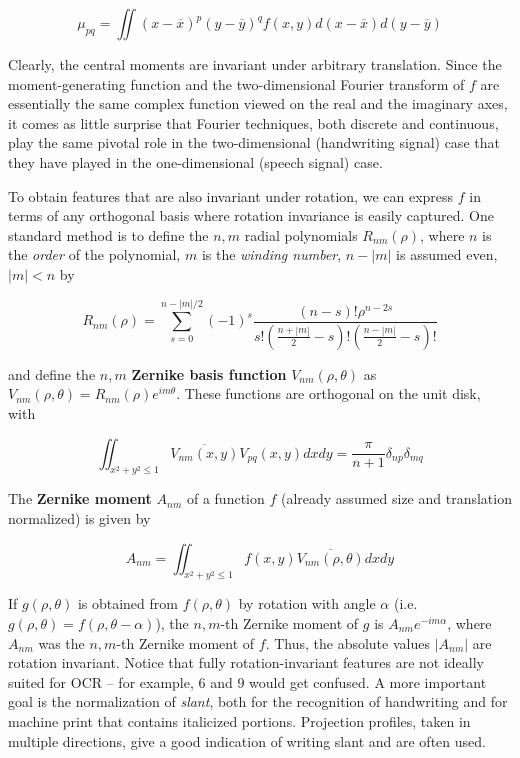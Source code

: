 \begin{equation}
\mu_{pq} = \iint (x-\overline{x})^p (y-\overline{y})^q f(x,y)
d(x-\overline{x}) d(y-\overline{y})
\end{equation}

\noindent
Clearly, the central moments are invariant under arbitrary translation. Since
the moment-generating function and the two-dimensional Fourier transform of $f$
are essentially the same complex function viewed on the real and the imaginary
axes, it comes as little surprise that Fourier techniques, both discrete and
continuous, play the same pivotal role in the two-dimensional (handwriting
signal) case that they have played in the one-dimensional (speech signal) case.

To obtain features that are also invariant under rotation, we can express $f$
in terms of any orthogonal basis where rotation invariance is easily captured.
One standard method is to define the $n,m$ radial polynomials $R_{nm}(\rho)$,
where $n$ is the {\it order} of the polynomial, $m$ is the {\it winding
  number}, $n-|m|$ is assumed even, $|m|<n$ by 

\begin{equation}
R_{nm}(\rho)=\sum_{s=0}^{n-|m|/2} (-1)^s \frac{(n-s)! \rho^{n-2s}}{s! \left( \frac{n+|m|}{2}-s \right) ! \left( \frac{n-|m|}{2}-s \right) !}
\end{equation}

\noindent and define the $n,m$ {\bf Zernike basis function}
$V_{nm}(\rho,\theta)$ as $V_{nm}(\rho,\theta)=R_{nm}(\rho)e^{im\theta}$. These
functions are orthogonal on the unit disk, with

\begin{equation}
\iint_{x^2+y^2 \leq 1} \overline{V_{nm}(x,y)}V_{pq}(x,y)dx dy =
\frac{\pi}{n+1} \delta_{np}\delta_{mq}
\end{equation}

\noindent
The {\bf Zernike moment} $A_{nm}$ of a function
$f$ (already assumed size and translation normalized) is given by 

\begin{equation}
A_{nm}=\iint_{x^2+y^2 \leq 1}f(x,y)\overline{V_{nm}(\rho,\theta)}dx dy
\end{equation}

\noindent
If $g(\rho,\theta)$ is obtained from $f(\rho,\theta)$ by rotation with angle
$\alpha$ (i.e. $g(\rho,\theta)=f(\rho,\theta-\alpha)$), the $n,m$-th Zernike
moment of $g$ is $A_{nm}e^{-i m\alpha}$, where $A_{nm}$ was the $n,m$-th
Zernike moment of $f$. Thus, the absolute values $|A_{nm}|$ are rotation
invariant. Notice that fully rotation-invariant features are not ideally
suited for OCR -- for example, $6$ and $9$ would get confused. A more
important goal is the normalization of {\it slant}, both for the recognition
of handwriting and for machine print that contains italicized portions.
Projection profiles, taken in multiple directions, give a good indication of
writing slant and are often used.

